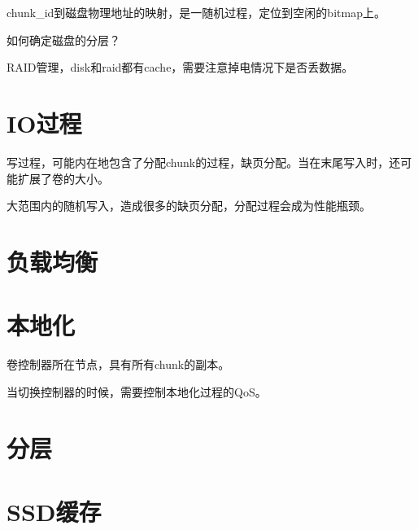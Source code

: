 chunk\_id到磁盘物理地址的映射，是一随机过程，定位到空闲的bitmap上。

如何确定磁盘的分层？

RAID管理，disk和raid都有cache，需要注意掉电情况下是否丢数据。

\section{IO过程}

写过程，可能内在地包含了分配chunk的过程，缺页分配。当在末尾写入时，还可能扩展了卷的大小。

大范围内的随机写入，造成很多的缺页分配，分配过程会成为性能瓶颈。

\section{负载均衡}

\section{本地化}

卷控制器所在节点，具有所有chunk的副本。

当切换控制器的时候，需要控制本地化过程的QoS。

\section{分层}

\section{SSD缓存}
